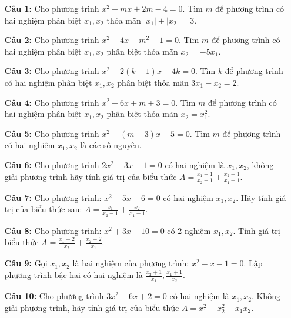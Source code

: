 \documentclass[12pt,a4paper]{extarticle}
\begin{document}
\makeheadbox[headerright={Tổng ôn 10-11},chude={CHỦ ĐỀ 01},tieude={Vi-et},dinhdang={Đại số},lop={12 },gv={Nguyễn Lê Minh Ngọc}]

\vspace{2em}



\begin{enumerate}
    \item[\textbf{Câu 1:}] Cho phương trình $x^2 + mx + 2m - 4 = 0$. Tìm $m$ để phương trình có hai nghiệm phân biệt $x_1, x_2$ thỏa mãn $|x_1| + |x_2| = 3$.
    
    \item[\textbf{Câu 2:}] Cho phương trình $x^2 - 4x - m^2 - 1 = 0$. Tìm $m$ để phương trình có hai nghiệm phân biệt $x_1, x_2$ phân biệt thỏa mãn $x_2 = -5x_1$.
    
    \item[\textbf{Câu 3:}] Cho phương trình $x^2 - 2(k-1)x - 4k = 0$. Tìm $k$ để phương trình có hai nghiệm phân biệt $x_1, x_2$ phân biệt thỏa mãn $3x_1 - x_2 = 2$.
    
    \item[\textbf{Câu 4:}] Cho phương trình $x^2 - 6x + m + 3 = 0$. Tìm $m$ để phương trình có hai nghiệm phân biệt $x_1, x_2$ phân biệt thỏa mãn $x_2 = x_1^2$.
    
    \item[\textbf{Câu 5:}] Cho phương trình $x^2 - (m-3)x - 5 = 0$. Tìm $m$ để phương trình có hai nghiệm $x_1, x_2$ là các số nguyên.
    
    \item[\textbf{Câu 6:}] Cho phương trình $2x^2 - 3x - 1 = 0$ có hai nghiệm là $x_1, x_2$, không giải phương trình hãy tính giá trị của biểu thức $A = \frac{x_1 - 1}{x_2 + 1} + \frac{x_2 - 1}{x_1 + 1}$.
    
    \item[\textbf{Câu 7:}] Cho phương trình: $x^2 - 5x - 6 = 0$ có hai nghiệm $x_1, x_2$. Hãy tính giá trị của biểu thức sau: $A = \frac{x_1}{x_2 - 1} + \frac{x_2}{x_1 - 1}$.
    
    \item[\textbf{Câu 8:}] Cho phương trình: $x^2 + 3x - 10 = 0$ có 2 nghiệm $x_1, x_2$. Tính giá trị biểu thức $A = \frac{x_1 + 2}{x_2} + \frac{x_2 + 2}{x_1}$.
    
    \item[\textbf{Câu 9:}] Gọi $x_1, x_2$ là hai nghiệm của phương trình: $x^2 - x - 1 = 0$. Lập phương trình bậc hai có hai nghiệm là $\frac{x_2 + 1}{x_1}, \frac{x_1 + 1}{x_2}$.
    
    \item[\textbf{Câu 10:}] Cho phương trình $3x^2 - 6x + 2 = 0$ có hai nghiệm là $x_1, x_2$. Không giải phương trình, hãy tính giá trị của biểu thức $A = x_1^2 + x_2^2 - x_1x_2$.
\end{enumerate}
\end{document}
